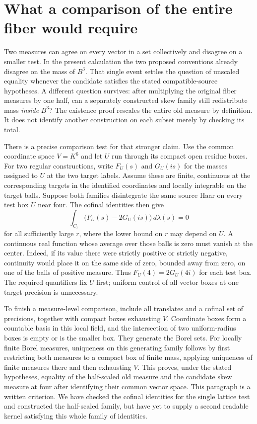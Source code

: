 \documentclass[12pt,letterpaper]{article}
\begin{document}
\section{What a comparison of the entire fiber would require}
Two measures can agree on every vector in a set collectively and disagree on a smaller test. In the present calculation the two proposed conventions already disagree on the mass of $B^3$. That single event settles the question of unscaled equality whenever the candidate satisfies the stated compatible-source hypotheses. A different question survives: after multiplying the original fiber measures by one half, can a separately constructed skew family still redistribute mass \emph{inside} $B^3$? The existence proof rescales the entire old measure by definition. It does not identify another construction on each subset merely by checking its total.

There is a precise comparison test for that stronger claim. Use the common coordinate space $V=K^6$ and let $U$ run through its compact open residue boxes. For two regular constructions, write $F_U(s)$ and $G_U(is)$ for the masses assigned to $U$ at the two target labels. Assume these are finite, continuous at the corresponding targets in the identified coordinates and locally integrable on the target balls. Suppose both families disintegrate the same source Haar on every test box $U$ near four. The cofinal identities then give
\[
  \int_{C_r} \big(F_U(s)-2G_U(is)\big)\,d\lambda(s)=0
\]
for all sufficiently large $r$, where the lower bound on $r$ may depend on $U$. A continuous real function whose average over those balls is zero must vanish at the center. Indeed, if its value there were strictly positive or strictly negative, continuity would place it on the same side of zero, bounded away from zero, on one of the balls of positive measure. Thus $F_U(4)=2G_U(4i)$ for each test box. The required quantifiers fix $U$ first; uniform control of all vector boxes at one target precision is unnecessary.

To finish a measure-level comparison, include all translates and a cofinal set of precisions, together with compact boxes exhausting $V$. Coordinate boxes form a countable basis in this local field, and the intersection of two uniform-radius boxes is empty or is the smaller box. They generate the Borel sets. For locally finite Borel measures, uniqueness on this generating family follows by first restricting both measures to a compact box of finite mass, applying uniqueness of finite measures there and then exhausting $V$. This proves, under the stated hypotheses, equality of the half-scaled old measure and the candidate skew measure at four after identifying their common vector space. This paragraph is a written criterion. We have checked the cofinal identities for the single lattice test and constructed the half-scaled family, but have yet to supply a second readable kernel satisfying this whole family of identities.
\end{document}
